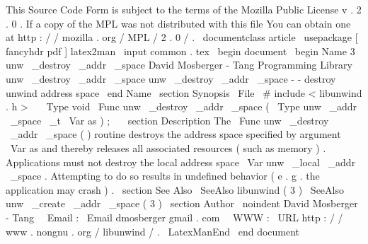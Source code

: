 %
This
Source
Code
Form
is
subject
to
the
terms
of
the
Mozilla
Public
%
License
v
.
2
.
0
.
If
a
copy
of
the
MPL
was
not
distributed
with
this
%
file
You
can
obtain
one
at
http
:
/
/
mozilla
.
org
/
MPL
/
2
.
0
/
.
\
documentclass
{
article
}
\
usepackage
[
fancyhdr
pdf
]
{
latex2man
}
\
input
{
common
.
tex
}
\
begin
{
document
}
\
begin
{
Name
}
{
3
}
{
unw
\
_destroy
\
_addr
\
_space
}
{
David
Mosberger
-
Tang
}
{
Programming
Library
}
{
unw
\
_destroy
\
_addr
\
_space
}
unw
\
_destroy
\
_addr
\
_space
-
-
destroy
unwind
address
space
\
end
{
Name
}
\
section
{
Synopsis
}
\
File
{
\
#
include
<
libunwind
.
h
>
}
\
\
\
Type
{
void
}
\
Func
{
unw
\
_destroy
\
_addr
\
_space
}
(
\
Type
{
unw
\
_addr
\
_space
\
_t
}
\
Var
{
as
}
)
;
\
\
\
section
{
Description
}
The
\
Func
{
unw
\
_destroy
\
_addr
\
_space
}
(
)
routine
destroys
the
address
space
specified
by
argument
\
Var
{
as
}
and
thereby
releases
all
associated
resources
(
such
as
memory
)
.
Applications
must
not
destroy
the
local
address
space
\
Var
{
unw
\
_local
\
_addr
\
_space
}
.
Attempting
to
do
so
results
in
undefined
behavior
(
e
.
g
.
the
application
may
crash
)
.
\
section
{
See
Also
}
\
SeeAlso
{
libunwind
(
3
)
}
\
SeeAlso
{
unw
\
_create
\
_addr
\
_space
(
3
)
}
\
section
{
Author
}
\
noindent
David
Mosberger
-
Tang
\
\
Email
:
\
Email
{
dmosberger
gmail
.
com
}
\
\
WWW
:
\
URL
{
http
:
/
/
www
.
nongnu
.
org
/
libunwind
/
}
.
\
LatexManEnd
\
end
{
document
}

